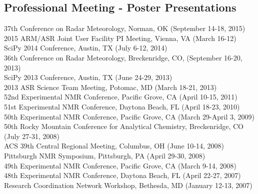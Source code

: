 \documentclass[margin,line]{res}
\begin{document}
\begin{resume}
\section{\sc Professional Meeting - Poster Presentations}
37th Conference on Radar Meteorology, Norman, OK (September 14-18, 2015)\\
2015 ARM/ASR Joint User Facility PI Meeting, Vienna, VA (March 16-12)\\
SciPy 2014 Conference, Austin, TX (July 6-12, 2014)\\
36th Conference on Radar Meteorology, Breckenridge, CO, (September 16-20, 2013)\\
SciPy 2013 Conference, Austin, TX (June 24-29, 2013)\\
2013 ASR Science Team Meeting, Potomac, MD (March 18-21, 2013)\\
52nd Experimental NMR Conference, Pacific Grove, CA (April 10-15, 2011) \\
51st Experimental NMR Conference, Daytona Beach, FL (April 18-23, 2010)\\
50th Experimental NMR Conference, Pacific Grove, CA (March 29-April 3, 2009)\\
50th Rocky Mountain Conference for Analytical Chemistry, Breckenridge, CO (July 27-31, 2008)\\
ACS 39th Central Regional Meeting, Columbus, OH (June 10-14, 2008)\\
Pittsburgh NMR Symposium, Pittsburgh, PA (April 29-30, 2008)\\
49th Experimental NMR Conference, Pacific Grove, CA (March 9-14, 2008)\\
48th Experimental NMR Conference, Daytona Beach, FL (April 22-27, 2007)\\
Research Coordination Network Workshop, Bethesda, MD (January 12-13, 2007)\\



\end{resume}
\end{document}
